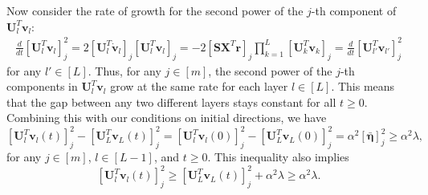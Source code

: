 \documentclass{article} %
\def\vr{{\bm{r}}}
\def\vv{{\bm{v}}}
\def\mS{{\bm{S}}}
\def\mU{{\bm{U}}}
\def\mX{{\bm{X}}}
\newcommand{\veta}{{\bm{\eta}}}
\begin{document}
Now consider the rate of growth for the second power of the $j$-th component of $\mU_l^T \vv_l$:
\begin{align*}
    \frac{d}{dt} [\mU_l^T \vv_l]_j^2
    = 2 [\mU_l^T \dot \vv_l]_j [\mU_l^T \vv_l]_j
    = -2 [\mS\mX^T \vr]_j \prod\nolimits_{k=1}^L [\mU_k^T \vv_k]_j
    = \frac{d}{dt} [\mU_{l'}^T \vv_{l'}]_j^2
\end{align*}
for any $l' \in [L]$. Thus, for any $j\in [m]$, the second power of the $j$-th components in $\mU_l^T \vv_l$ grow at the same rate for each layer $l \in [L]$. This means that the gap between any two different layers stays constant for all $t \geq 0$. Combining this with our conditions on initial directions, we have
\begin{equation*}
    [\mU_l^T \vv_l(t)]_j^2 - [\mU_L^T \vv_L(t)]_j^2
    = [\mU_l^T \vv_l(0)]_j^2 - [\mU_L^T \vv_L(0)]_j^2
    = \alpha^2 [\bar \veta]_j^2 \geq \alpha^2 \lambda,
\end{equation*}
for any $j \in [m]$, $l \in [L-1]$, and $t \geq 0$. This inequality also implies
\begin{equation}
\label{eq:proof-reg-meta1-2}
    [\mU_l^T \vv_l(t)]_j^2 
    \geq 
    [\mU_L^T \vv_L(t)]_j^2 + \alpha^2 \lambda
    \geq
    \alpha^2 \lambda.
\end{equation}
\end{document}
